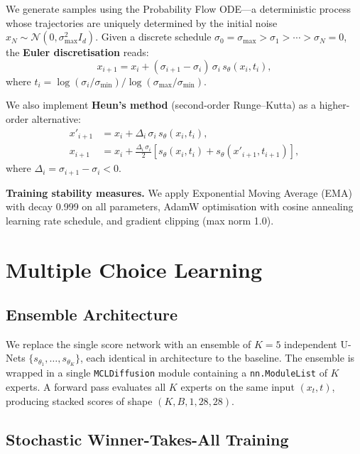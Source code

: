 \documentclass[11pt,a4paper]{article}
\newcommand{\N}{\mathcal{N}}
\newcommand{\Id}{I_d}
\begin{document}
We generate samples using the Probability Flow ODE---a deterministic
process whose trajectories are uniquely determined by the initial noise
$x_N \sim \N(0, \sigma_{\max}^2 \Id)$. Given a discrete schedule
$\sigma_0 = \sigma_{\max} > \sigma_1 > \cdots > \sigma_N = 0$,
the \textbf{Euler discretisation} reads:
\begin{equation}
  x_{i+1} = x_i + (\sigma_{i+1} - \sigma_i)\,\sigma_i\, s_\theta(x_i, t_i),
  \label{eq:euler}
\end{equation}
where $t_i = \log(\sigma_i / \sigma_{\min}) / \log(\sigma_{\max} /
\sigma_{\min})$.

We also implement \textbf{Heun's method} (second-order Runge--Kutta) as a
higher-order alternative:
\begin{align}
  x'_{i+1} &= x_i + \Delta_i\,\sigma_i\, s_\theta(x_i, t_i),
  \label{eq:heun1}\\
  x_{i+1}  &= x_i + \frac{\Delta_i\,\sigma_i}{2}
  \left[s_\theta(x_i, t_i) + s_\theta(x'_{i+1}, t_{i+1})\right],
  \label{eq:heun2}
\end{align}
where $\Delta_i = \sigma_{i+1} - \sigma_i < 0$.

\textbf{Training stability measures.} We apply Exponential Moving Average
(EMA) with decay 0.999 on all parameters, AdamW optimisation with cosine
annealing learning rate schedule, and gradient clipping (max norm 1.0).

\section{Multiple Choice Learning}
\label{sec:mcl}

\subsection{Ensemble Architecture}

We replace the single score network with an ensemble of $K = 5$
independent U-Nets $\{s_{\theta_1}, \ldots, s_{\theta_K}\}$, each
identical in architecture to the baseline. The ensemble is wrapped in a
single \texttt{MCLDiffusion} module containing a
\texttt{nn.ModuleList} of $K$ experts. A forward pass evaluates all $K$
experts on the same input $(x_t, t)$, producing stacked scores of shape
$(K, B, 1, 28, 28)$.

\subsection{Stochastic Winner-Takes-All Training}
\end{document}
